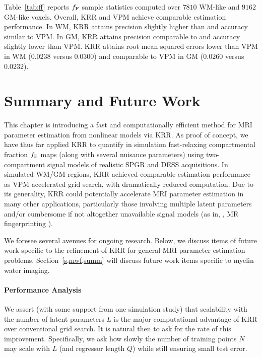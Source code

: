 Table~\ref{tab:ff} reports $f_{\mathrm{F}}$ sample statistics 
computed over $7810$ WM-like and $9162$ GM-like voxels. 
Overall, 
KRR and VPM achieve comparable estimation performance.
In WM,
KRR attains precision slightly higher than
and accuracy similar to VPM.
In GM,
KRR attains precision comparable to
and accuracy slightly lower than VPM.
KRR attains root mean squared errors
lower than VPM in WM ($0.0238$ versus $0.0300$)
and comparable to VPM in GM ($0.0260$ versus $0.0232$).

\section{Summary and Future Work}
\label{s,krr,summ}

This chapter is introducing
a fast and computationally efficient method
for MRI parameter estimation
from nonlinear models
via KRR.
As proof of concept,
we have thus far applied KRR
to quantify in simulation
fast-relaxing compartmental fraction $f_{\mathrm{F}}$ maps
(along with several nuisance parameters)
using two-compartment signal models
of realistic SPGR and DESS acquisitions.
In simulated \ffest WM/GM regions,
KRR achieved comparable estimation performance
as VPM-accelerated grid search,
with dramatically reduced computation.
Due to its generality,
KRR could potentially accelerate
MRI parameter estimation
in many other applications,
particularly those
involving multiple latent parameters
and/or
cumbersome if not altogether unavailable signal models
(as in, \eg, MR fingerprinting \cite{ma:13:mrf}).

We foresee several avenues for ongoing research.
Below, we discuss items of future work 
specific to the refinement of KRR 
for general MRI parameter estimation problems.
Section~\ref{s,mwf,summ} will discuss
future work items specific to myelin water imaging.

\paragraph{Performance Analysis}
We assert 
(with some support from one simulation study)
that scalability
with the number of latent parameters $L$
is the major computational advantage
of KRR over conventional grid search.
It is natural then to ask
for the rate of this improvement.
Specifically,
we ask how slowly the number
of training points $N$ may scale 
with $L$ (and regressor length $Q$) 
while still ensuring small test error.

